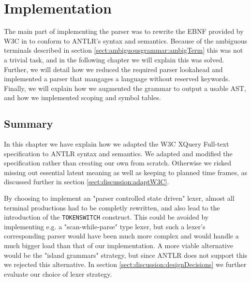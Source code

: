 \chapter{Implementation}
\label{chapter:implementation}

The main part of implementing the parser was to rewrite the EBNF provided by
W3C in \cite{w3c01} to conform to ANTLR's syntax and semantics. Because of the
ambiguous terminals described in section \ref{sect:ambiguousgrammar:ambigTerm}
this was not a trivial task, and in the following chapter we will explain this
was solved. Further, we will detail how we reduced the required parser
lookahead and implemented a parser that mangages a language without reserved
keywords. Finally, we will explain how we augmented the grammar to output a
usable AST, and how we implemented scoping and symbol tables.













\section{Summary}
In this chapter we have explain how we adapted the W3C
XQuery Full-text specification to ANTLR syntax and semantics. We adapted and
modified the specification rather than creating our own from scratch. Otherwise
we risked missing out essential latent meaning as well as keeping to planned
time frames, as discussed further in section \ref{sect:discussion:adaptW3C}.    

By choosing to implement an "parser controlled state driven" lexer, almost all
terminal productions  had to be completly rewritten, and also lead to the
introduction of the \verb!TOKENSWITCH! construct. This could be avoided by
implementing e.g. a "scan-while-parse" type lexer, but such a lexer's
corresponding parser would have been much more complex and would handle a much
bigger load than that of our implementation. A more viable alternative would be
the "island grammars" strategy, but since ANTLR does not support this we
rejected this alternative. In section \ref{sect:discussion:designDecisions} we
further evaluate our choice of lexer strategy.

